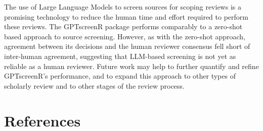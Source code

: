 \documentclass[10pt,a4paper,twocolumn]{article}
\begin{document}
The use of Large Language Models to screen sources for scoping reviews is a promising technology to reduce the human time and effort required to perform these reviews. The GPTscreenR package performs comparably to a zero-shot based approach to source screening. However, as with the zero-shot approach, agreement between its decisions and the human reviewer consensus fell short of inter-human agreement, suggesting that LLM-based screening is not yet as reliable as a human reviewer. Future work may help to further quantify and refine GPTscreenR's performance, and to expand this approach to other types of scholarly review and to other stages of the review process.

\section{References}

\printbibliography
\end{document}

